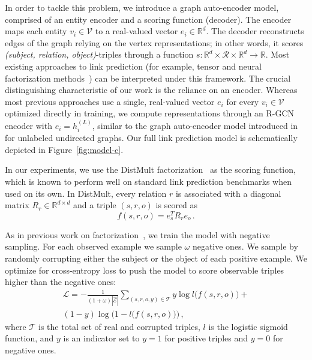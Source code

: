 In order to tackle this problem, we introduce a graph auto-encoder model, comprised of an entity encoder and a scoring function (decoder). The encoder maps each entity $v_i \in \mathcal{V}$ to a real-valued vector $e_i \in \mathbb{R}^d$. The decoder reconstructs edges of the graph relying on the vertex representations; in other words, it scores \textit{(subject, relation, object)}-triples through a function $s: \mathbb{R}^d \times \mathcal{R} \times \mathbb{R}^d \to \mathbb{R}$. Most existing approaches to link prediction (for example, tensor and neural factorization methods~\cite{socher2013reasoning,lin2015modeling,toutanova2016compositional,distmult-embedding_entities_and_relations,complex-complex_embeddings_for_simple_link_prediction}) can be interpreted under this framework. The crucial distinguishing characteristic of our work is the reliance on an encoder. Whereas most previous approaches use a single, real-valued vector $e_i$ for every $v_i \in \mathcal{V}$ optimized directly in training, %
we compute representations through an R-GCN encoder with $e_i = h_i^{(L)}$, similar to the graph auto-encoder model introduced in \citet{kipf2016variational} for unlabeled undirected graphs.
Our full link prediction model is schematically depicted in Figure~\ref{fig:model-c}.

In our experiments, we use the DistMult factorization~\cite{distmult-embedding_entities_and_relations} as the scoring function, which is known to perform well on standard link prediction benchmarks when used on its own.
In DistMult, every relation $r$ is associated with a diagonal matrix $R_r
\in \mathbb{R}^{d \times d}$ and a triple $(s, r, o)$ is scored as
\begin{equation}
f(s, r, o) = e_s^T R_r e_o \, .
\end{equation}

As in  previous work on factorization~\cite{distmult-embedding_entities_and_relations,complex-complex_embeddings_for_simple_link_prediction}, we train the model with negative sampling. For each observed example we sample $\omega$ negative ones. We sample by randomly corrupting either the subject or the object of each positive example.
We optimize for cross-entropy loss to push the model to score observable triples higher than the negative ones:
\begin{equation}
\begin{split}
\mathcal{L} = - \frac{1}{ (1+\omega) |\mathcal{\hat{E}}|}\sum\limits_{(s,r,o,y) \in \mathcal{T}} y \log l\bigl(f(s,r,o)\bigr) + \\
(1-y) \log\bigl(1-l\bigl(f(s,r,o)\bigr)\bigr) \, ,
\end{split}
\end{equation}
where $\mathcal{T}$ is the total set of real and corrupted triples, $l$ is the logistic sigmoid function, and $y$ is an indicator set to $y=1$ for positive triples and $y=0$ for negative ones.

